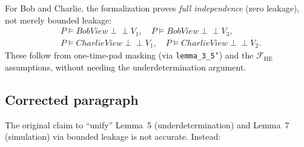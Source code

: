 \documentclass{article}
\begin{document}
For Bob and Charlie, the formalization proves \emph{full independence} (zero leakage), not merely bounded leakage:
\begin{align*}
  &P \models \mathit{BobView} \perp\!\!\!\perp V_1, \quad P \models \mathit{BobView} \perp\!\!\!\perp V_3, \\
  &P \models \mathit{CharlieView} \perp\!\!\!\perp V_1, \quad P \models \mathit{CharlieView} \perp\!\!\!\perp V_2.
\end{align*}
These follow from one-time-pad masking (via \texttt{lemma\_3\_5'}) and the $\mathcal{F}_{\mathrm{HE}}$ assumptions, without needing the underdetermination argument.

\subsection*{Corrected paragraph}

The original claim to ``unify'' Lemma~5 (underdetermination) and Lemma~7 (simulation) via bounded leakage is not accurate. Instead:
\end{document}
